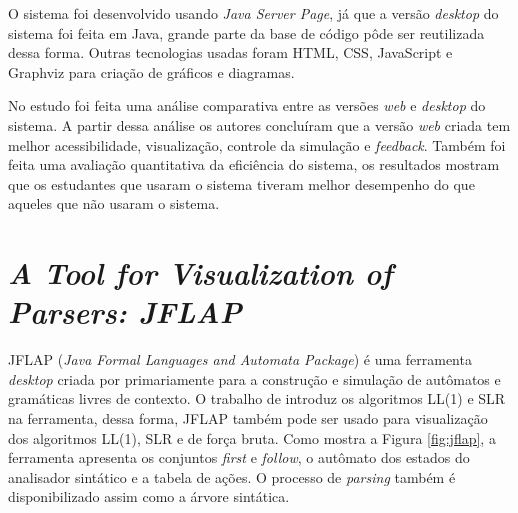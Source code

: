 O sistema foi desenvolvido usando \textit{Java Server Page}, já que a versão \textit{desktop} do sistema foi feita em Java, grande parte da base de código pôde ser reutilizada dessa forma. Outras tecnologias usadas foram HTML, CSS, JavaScript e Graphviz para criação de gráficos e diagramas.

No estudo foi feita uma análise comparativa entre as versões \textit{web} e \textit{desktop} do sistema. A partir dessa análise os autores concluíram que a versão \textit{web} criada tem melhor acessibilidade, visualização, controle da simulação e \textit{feedback}. Também foi feita uma avaliação quantitativa da eficiência do sistema, os resultados mostram que os estudantes que usaram o sistema tiveram melhor desempenho do que aqueles que não usaram o sistema.


\section{\textit{A Tool for Visualization of Parsers: JFLAP}}
JFLAP (\textit{Java Formal Languages and Automata Package}) é uma ferramenta \textit{desktop} criada por \textcite{jflap} primariamente para a construção e simulação de autômatos e gramáticas livres de contexto. O trabalho de \textcite{jflapparser} introduz os algoritmos LL(1) e SLR na ferramenta, dessa forma, JFLAP também pode ser usado para visualização dos algoritmos LL(1), SLR e de força bruta. Como mostra a Figura \ref{fig:jflap}, a ferramenta apresenta os conjuntos \textit{first} e \textit{follow}, o autômato dos estados do analisador sintático e a tabela de ações. O processo de \textit{parsing} também é disponibilizado assim como a árvore sintática.

\begin{figure}[ht]
  \captionsetup{width=16cm}
\end{figure}

